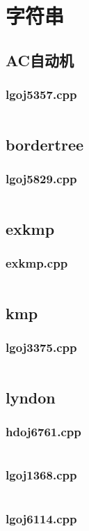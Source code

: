 \documentclass[a4paper,landscape,twocolumn]{article} %
\begin{document}
\section{字符串}
\subsection{AC自动机}
\subsubsection{lgoj5357.cpp}
\inputminted{c++}{./codes/012}
\subsection{bordertree}
\subsubsection{lgoj5829.cpp}
\inputminted{c++}{./codes/013}
\subsection{exkmp}
\subsubsection{exkmp.cpp}
\inputminted{c++}{./codes/014}
\subsection{kmp}
\subsubsection{lgoj3375.cpp}
\inputminted{c++}{./codes/015}
\subsection{lyndon}
\subsubsection{hdoj6761.cpp}
\inputminted{c++}{./codes/016}
\subsubsection{lgoj1368.cpp}
\inputminted{c++}{./codes/017}
\subsubsection{lgoj6114.cpp}
\inputminted{c++}{./codes/018}
\end{document}
